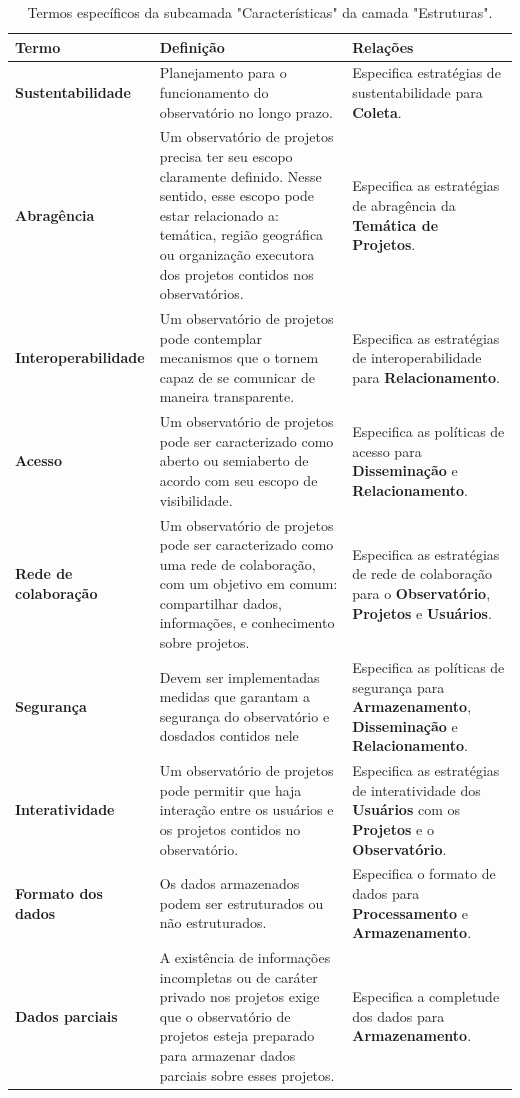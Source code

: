 \begin{apendicesenv}
\begin{table}[H]
\centering
\caption{Termos específicos da subcamada "Características" da camada "Estruturas".}
\begin{tabularx}{\textwidth}{|l|X|X|}
\hline
\textbf{Termo} & \textbf{Definição} & \textbf{Relações} \\ \hline
\textbf{Sustentabilidade}   & Planejamento para o funcionamento do observatório no longo prazo. & Especifica estratégias de sustentabilidade para \textbf{Coleta}. \\ \hline
\textbf{Abragência} & Um observatório de projetos precisa ter seu escopo claramente definido. Nesse sentido,
esse escopo pode estar relacionado a: temática, região geográfica ou organização executora dos projetos contidos nos observatórios.
  & Especifica as estratégias de abragência da \textbf{Temática de Projetos}. \\ \hline
\textbf{Interoperabilidade} & Um observatório de projetos pode contemplar mecanismos que o tornem capaz de se comunicar de maneira transparente. & Especifica as estratégias de interoperabilidade para \textbf{Relacionamento}. \\ \hline
\textbf{Acesso} & Um observatório de projetos pode ser caracterizado como aberto ou semiaberto de acordo com seu escopo de visibilidade. & Especifica as políticas de acesso para \textbf{Disseminação} e \textbf{Relacionamento}. \\ \hline
\textbf{Rede de colaboração}   & Um observatório de projetos pode ser caracterizado como uma rede de colaboração, com um objetivo em comum: compartilhar dados, informações, e conhecimento sobre projetos. & Especifica as estratégias de rede de colaboração para o \textbf{Observatório}, \textbf{Projetos} e \textbf{Usuários}. \\ \hline
\textbf{Segurança}   & Devem ser implementadas medidas que garantam a segurança do observatório e dosdados contidos nele & Especifica as políticas de segurança para \textbf{Armazenamento}, \textbf{Disseminação} e \textbf{Relacionamento}. \\ \hline
\textbf{Interatividade}  & Um observatório de projetos pode permitir que haja interação entre os usuários e os projetos contidos no observatório. & Especifica as estratégias de interatividade dos \textbf{Usuários} com os \textbf{Projetos} e o \textbf{Observatório}. \\ \hline
\textbf{Formato dos dados} & Os dados armazenados podem ser estruturados ou não estruturados. & Especifica o formato de dados para \textbf{Processamento} e \textbf{Armazenamento}. \\ \hline
\textbf{Dados parciais}   & A existência de informações incompletas ou de caráter privado nos projetos exige que o observatório de projetos esteja preparado para armazenar dados parciais sobre esses projetos. & Especifica a completude dos dados para \textbf{Armazenamento}. \\ \hline
\end{tabularx}
\end{table}


\end{apendicesenv}
